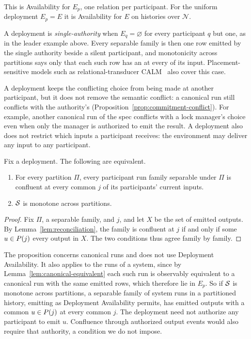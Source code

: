 This is Availability for $E_p$, one relation per participant.  For the uniform
deployment $E_p=E$ it is Availability for $E$ on histories over $\mathcal N$.

A deployment is \emph{single-authority} when $E_q=\varnothing$ for every
participant $q$ but one, as in the leader example above.  Every separable
family is then one row emitted by the single authority beside a silent
participant, and monotonicity across partitions says only that each such row
has an \outnoun at every \indesc of its input.  Placement-sensitive models
such as relational-transducer CALM~\cite{ameloot2013relational,ameloot2015weaker}
also cover this case.

A deployment keeps the conflicting choice from being made at another
participant, but it does not remove the semantic conflict: a canonical run
still conflicts with the authority's \commitment
(Proposition~\ref{prop:commitment-conflict}).  For example, another canonical
run of the spec conflicts with a lock manager's choice even when only the
manager is authorized to emit the result.  A deployment also does not restrict
which inputs a participant receives: the environment may deliver any input to
any participant.

\begin{proposition}
\label{thm:complete-cap-deployment}
Fix a deployment.  The following are equivalent.
\begin{enumerate}
  \item For every partition $\Pi$, every participant run family separable
        under $\Pi$ is confluent at every common \indesc $j$ of its
        participants' current inputs.
  \item $\mathcal{S}$ is monotone across partitions.
\end{enumerate}
\end{proposition}

\begin{proof}
Fix $\Pi$, a separable family, and $j$, and let $X$ be the set of emitted
outputs.  By Lemma~\ref{lem:reconciliation}, the family is confluent at $j$ if
and only if some $u\in P(j)$ \outrel every output in $X$.  The two
conditions thus agree family by family.
\end{proof}

The proposition concerns canonical runs and does not use Deployment
Availability.  It also applies to the runs of a system, since by
Lemma~\ref{lem:canonical-equivalent} each such run is observably equivalent to
a canonical run with the same emitted rows, which therefore lie in $E_p$.  So
if $\mathcal{S}$ is monotone across partitions, a separable family of system runs in
a partitioned history, emitting as Deployment Availability permits, has
emitted outputs with a common \outnoun $u\in P(j)$ at every common
\indesc $j$.  The deployment need not authorize any participant to emit $u$.
Confluence through authorized output events would also require that
authority, a condition we do not impose.

